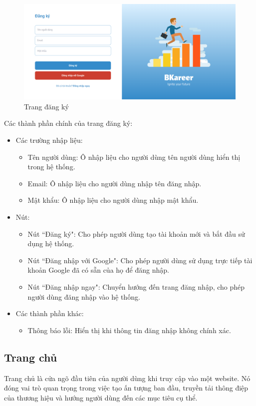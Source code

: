 \begin{figure}[H]
    \centering
    \includegraphics[width=0.8\linewidth]{images/chap5/register.png}
    \vspace{0.5cm}
    \caption{Trang đăng ký}
\end{figure}

Các thành phần chính của trang đăng ký:
\begin{itemize}
    \item Các trường nhập liệu:
        \begin{itemize}
            \item Tên người dùng: Ô nhập liệu cho người dùng tên người dùng hiển thị trong hệ thống.
            \item Email: Ô nhập liệu cho người dùng nhập tên đăng nhập.
            \item Mật khẩu: Ô nhập liệu cho người dùng nhập mật khẩu.
        \end{itemize}
    \item Nút:
        \begin{itemize}
            \item Nút ``Đăng ký": Cho phép người dùng tạo tài khoản mới và bắt đầu sử dụng hệ thống.
            \item Nút ``Đăng nhập với Google": Cho phép người dùng sử dụng trực tiếp tài khoản Google đã có sẵn của họ để đăng nhập.
            \item Nút ``Đăng nhập ngay": Chuyển hướng đến trang đăng nhập, cho phép người dùng đăng nhập vào hệ thống.
        \end{itemize}
    \item Các thành phần khác:
        \begin{itemize}
            \item Thông báo lỗi: Hiển thị khi thông tin đăng nhập không chính xác.
        \end{itemize}
\end{itemize}


\subsection{Trang chủ}
Trang chủ là cửa ngõ đầu tiên của người dùng khi truy cập vào một website. Nó đóng vai trò quan trọng trong việc tạo ấn tượng ban đầu, truyền tải thông điệp của thương hiệu và hướng người dùng đến các mục tiêu cụ thể.

